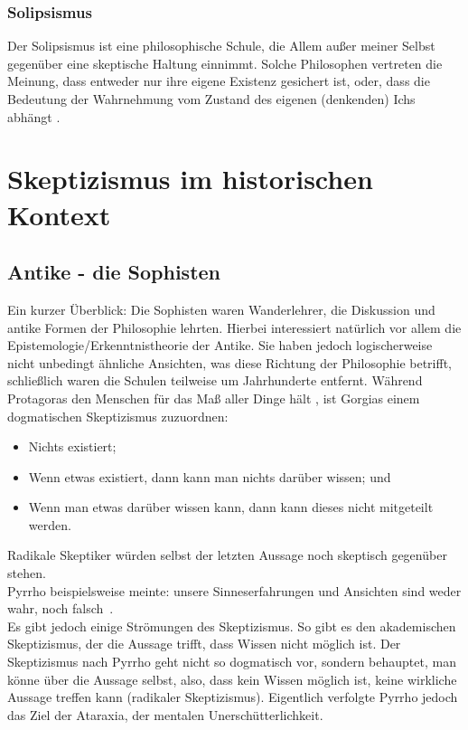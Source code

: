 \documentclass[12pt,a4paper]{article}
\begin{document}
		\subsubsection{Solipsismus}
Der Solipsismus ist eine philosophische Schule, die Allem außer meiner Selbst gegenüber eine skeptische Haltung einnimmt. Solche Philosophen vertreten die Meinung, dass entweder nur ihre eigene Existenz gesichert ist, oder, dass die Bedeutung der Wahrnehmung vom Zustand des eigenen (denkenden) Ichs abhängt \cite{iep_solipsis}.%
\section{Skeptizismus im historischen Kontext}
	\subsection{Antike - die Sophisten}
Ein kurzer Überblick: Die Sophisten waren Wanderlehrer, die Diskussion und antike Formen der Philosophie lehrten. Hierbei interessiert natürlich vor allem die Epistemologie\slash Erkenntnistheorie der Antike. Sie haben jedoch logischerweise nicht unbedingt ähnliche Ansichten, was diese Richtung der Philosophie betrifft, schließlich waren die Schulen teilweise um Jahrhunderte entfernt. Während Protagoras den Menschen für das Maß aller Dinge hält \cite{enc_brit_sophist}%
, ist Gorgias einem dogmatischen Skeptizismus zuzuordnen:
\begin{itemize}
\item Nichts existiert;
\item Wenn etwas existiert, dann kann man nichts darüber wissen; und
\item Wenn man etwas darüber wissen kann, dann kann dieses nicht mitgeteilt werden. \cite{iep_on-the-nonex} 
\end{itemize}
Radikale Skeptiker würden selbst der letzten Aussage noch skeptisch gegenüber stehen.\\
Pyrrho beispielsweise meinte: \glqq unsere Sinneserfahrungen und Ansichten sind weder wahr, noch falsch\grqq\ \cite{greek_stough}.\\
Es gibt jedoch einige Strömungen des Skeptizismus. So gibt es den akademischen Skeptizismus, der die Aussage trifft, dass Wissen nicht möglich ist. Der Skeptizismus nach Pyrrho geht nicht so dogmatisch vor, sondern behauptet, man könne über die Aussage selbst, also, dass kein Wissen möglich ist, keine wirkliche Aussage treffen kann (radikaler Skeptizismus). %
Eigentlich verfolgte Pyrrho jedoch das Ziel der Ataraxia, der mentalen Unerschütterlichkeit.
\end{document}
